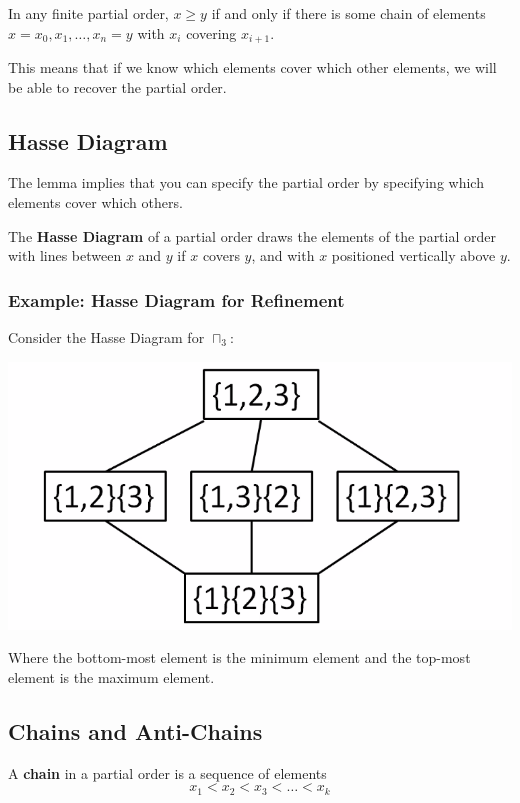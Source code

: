 \documentclass[letterpaper]{article}
\begin{document}
\begin{lemma}{}{}
    In any finite partial order, $x \geq y$ if and only if there is some chain of elements $x = x_0, x_1, \dots, x_n = y$ with $x_i$ covering $x_{i + 1}$. 
\end{lemma}
This means that if we know which elements cover which other elements, we will be able to recover the partial order. 


\subsection{Hasse Diagram}
The lemma implies that you can specify the partial order by specifying which elements cover which others. 

\begin{definition}{}{}
    The \textbf{Hasse Diagram} of a partial order draws the elements of the partial order with lines between $x$ and $y$ if $x$ covers $y$, and with $x$ positioned vertically above $y$.
\end{definition}

\subsubsection{Example: Hasse Diagram for Refinement}
Consider the Hasse Diagram for $\sqcap_3$:
\begin{center}
    \includegraphics[scale=0.5]{ex_hasse.PNG}
\end{center}
Where the bottom-most element is the minimum element and the top-most element is the maximum element. 

\subsection{Chains and Anti-Chains}
\begin{definition}{}{}
    A \textbf{chain} in a partial order is a sequence of elements
    \[x_1 < x_2 < x_3 < \dots < x_k\]
\end{definition}
\end{document}
